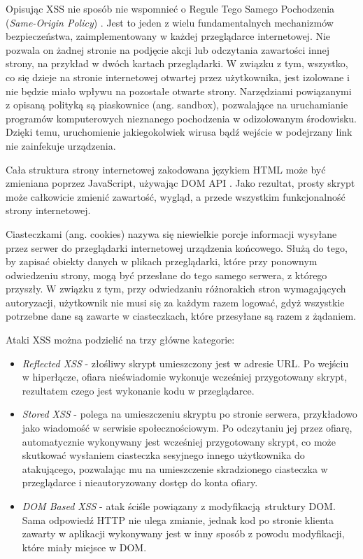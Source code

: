 \documentclass[12pt,twoside]{article}
\begin{document}
Opisując XSS nie sposób nie wspomnieć o Regule Tego Samego Pochodzenia (\emph{Same-Origin Policy}) \cite{SameOriginPolicy}. Jest to jeden z wielu fundamentalnych mechanizmów bezpieczeństwa, zaimplementowany w każdej przeglądarce internetowej. Nie pozwala on żadnej stronie na podjęcie akcji lub odczytania zawartości innej strony, na przykład w dwóch kartach przeglądarki. W związku z tym, wszystko, co się dzieje na stronie internetowej otwartej przez użytkownika, jest izolowane i nie będzie miało wpływu na pozostałe otwarte strony. Narzędziami powiązanymi z opisaną polityką są piaskownice (ang. sandbox), pozwalające na uruchamianie programów komputerowych nieznanego pochodzenia w odizolowanym środowisku. Dzięki temu, uruchomienie jakiegokolwiek wirusa bądź wejście w podejrzany link nie zainfekuje urządzenia.
	
	Cała struktura strony internetowej zakodowana językiem HTML może być zmieniana poprzez JavaScript, używając DOM API \cite{DOM}. Jako rezultat, prosty skrypt może całkowicie zmienić zawartość, wygląd, a przede wszystkim funkcjonalność strony internetowej.
	
	Ciasteczkami (ang. cookies) \cite{Cookies} nazywa się niewielkie porcje informacji wysyłane przez serwer do przeglądarki internetowej urządzenia końcowego. Służą do tego, by zapisać obiekty danych w plikach przeglądarki, które przy ponownym odwiedzeniu strony, mogą być przesłane do tego samego serwera, z którego przyszły. W związku z tym, przy odwiedzaniu różnorakich stron wymagających autoryzacji, użytkownik nie musi się za każdym razem logować, gdyż wszystkie potrzebne dane są zawarte w ciasteczkach, które przesyłane są razem z żądaniem. 
	
	Ataki XSS można podzielić na trzy główne kategorie:
	
	\begin{itemize}
		\item \emph{Reflected XSS} - złośliwy skrypt umieszczony jest w adresie URL. Po wejściu w hiperłącze, ofiara nieświadomie wykonuje wcześniej przygotowany skrypt, rezultatem czego jest wykonanie kodu w przeglądarce.
		\item \emph{Stored XSS} - polega na umieszczeniu skryptu po stronie serwera, przykładowo jako wiadomość w serwisie społecznościowym. Po odczytaniu jej przez ofiarę, automatycznie wykonywany jest wcześniej przygotowany skrypt, co może skutkować wysłaniem ciasteczka sesyjnego innego użytkownika do atakującego, pozwalając mu na umieszczenie skradzionego ciasteczka w przeglądarce i nieautoryzowany dostęp do konta ofiary.
		\item \emph{DOM Based XSS} - atak ściśle powiązany z modyfikacją struktury DOM. Sama odpowiedź HTTP nie ulega zmianie, jednak kod po stronie klienta zawarty w aplikacji wykonywany jest w inny sposób z powodu modyfikacji, które miały miejsce w DOM.
	\end{itemize}
	
\end{document}
